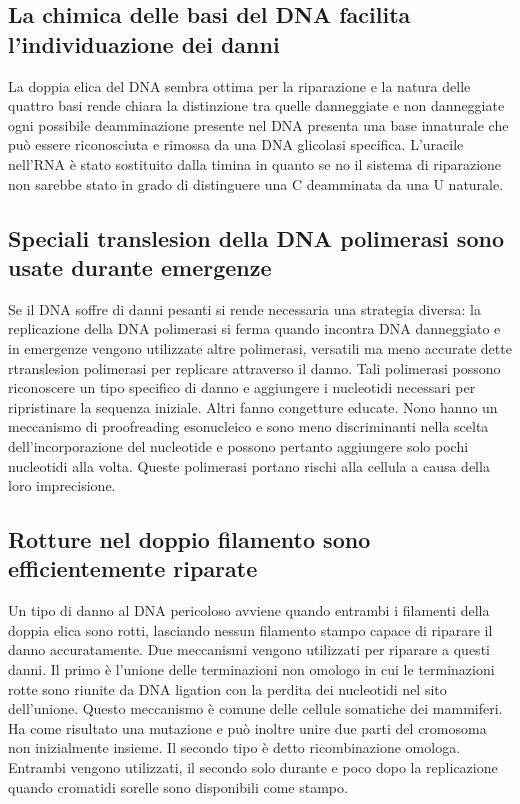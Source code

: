 \subsection{La chimica delle basi del DNA facilita l'individuazione dei danni}
La doppia elica del DNA sembra ottima per la riparazione e la natura delle quattro basi rende chiara la distinzione tra quelle danneggiate e non danneggiate ogni possibile deamminazione
presente nel DNA presenta una base innaturale che pu\`o essere riconosciuta e rimossa da una DNA glicolasi specifica. L'uracile nell'RNA \`e stato sostituito dalla timina in quanto 
se no il sistema di riparazione non sarebbe stato in grado di distinguere una C deamminata da una U naturale. 
\subsection{Speciali translesion della DNA polimerasi sono usate durante emergenze}
Se il DNA soffre di danni pesanti si rende necessaria una strategia diversa: la replicazione della DNA polimerasi si ferma quando incontra DNA danneggiato  e in emergenze vengono
utilizzate altre polimerasi, versatili ma meno accurate dette rtranslesion polimerasi per replicare attraverso il danno. Tali polimerasi possono riconoscere un tipo specifico di danno 
e aggiungere i nucleotidi necessari per ripristinare la sequenza iniziale. Altri fanno congetture educate. Nono hanno un meccanismo di proofreading esonucleico e sono 
meno discriminanti nella scelta dell'incorporazione del nucleotide e possono pertanto aggiungere solo pochi nucleotidi alla volta. Queste polimerasi portano rischi alla cellula a causa 
della loro imprecisione. 
\subsection{Rotture nel doppio filamento sono efficientemente riparate}
Un tipo di danno al DNA pericoloso avviene quando entrambi i filamenti della doppia elica sono rotti, lasciando nessun filamento stampo capace di riparare il danno accuratamente. Due
meccanismi vengono utilizzati per riparare a questi danni. Il primo \`e l'unione delle terminazioni non omologo in cui le terminazioni rotte sono riunite da DNA ligation con la 
perdita dei nucleotidi nel sito dell'unione. Questo meccanismo \`e comune delle cellule somatiche dei mammiferi. Ha come risultato una mutazione e pu\`o inoltre unire due parti 
del cromosoma non inizialmente insieme. Il secondo tipo \`e detto ricombinazione omologa. Entrambi vengono utilizzati, il secondo solo durante e poco dopo la replicazione quando cromatidi
sorelle sono disponibili come stampo. 
